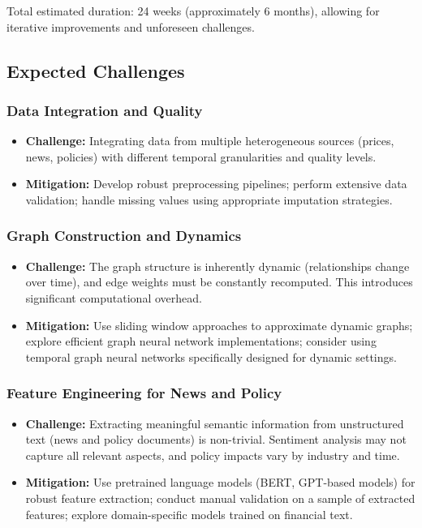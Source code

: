 Total estimated duration: 24 weeks (approximately 6 months), allowing for iterative improvements and unforeseen challenges.

\subsection{Expected Challenges}

\subsubsection{Data Integration and Quality}
\begin{itemize}
    \item \textbf{Challenge:} Integrating data from multiple heterogeneous sources (prices, news, policies) with different temporal granularities and quality levels.
    \item \textbf{Mitigation:} Develop robust preprocessing pipelines; perform extensive data validation; handle missing values using appropriate imputation strategies.
\end{itemize}

\subsubsection{Graph Construction and Dynamics}
\begin{itemize}
    \item \textbf{Challenge:} The graph structure is inherently dynamic (relationships change over time), and edge weights must be constantly recomputed. This introduces significant computational overhead.
    \item \textbf{Mitigation:} Use sliding window approaches to approximate dynamic graphs; explore efficient graph neural network implementations; consider using temporal graph neural networks specifically designed for dynamic settings.
\end{itemize}

\subsubsection{Feature Engineering for News and Policy}
\begin{itemize}
    \item \textbf{Challenge:} Extracting meaningful semantic information from unstructured text (news and policy documents) is non-trivial. Sentiment analysis may not capture all relevant aspects, and policy impacts vary by industry and time.
    \item \textbf{Mitigation:} Use pretrained language models (BERT, GPT-based models) for robust feature extraction; conduct manual validation on a sample of extracted features; explore domain-specific models trained on financial text.
\end{itemize}

